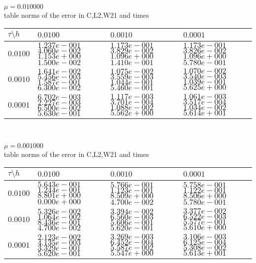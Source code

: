 
\begin{center}
$\mu=0.010000 $\\ 
table norms of the error in C,L2,W21 and times
\\[2.0ex]  
  
\begin{tabular}{|p{0.6in}|p{0.7in}|p{0.7in}|p{0.7in}|} \hline
$\tau\setminus h$ & $0.0100$& $0.0010$& $0.0001$\\ \hline

$0.0100$ & $1.237e-001$ $4.060e-002$ $1.153e+000$ $1.500e-002$ &$1.173e-001$ $3.829e-002$ $1.096e+000$ $1.410e-001$ &$1.173e-001$ $3.826e-002$ $1.096e+000$ $5.780e-001$  \\ \hline
$0.0010$ & $1.641e-002$ $5.456e-003$ $1.587e-001$ $6.300e-002$ &$1.075e-002$ $3.559e-003$ $1.044e-001$ $5.460e-001$ &$1.070e-002$ $3.540e-003$ $1.039e-001$ $5.625e+000$  \\ \hline
$0.0001$ & $6.702e-003$ $2.227e-003$ $6.500e-002$ $5.630e-001$ &$1.117e-003$ $3.701e-004$ $1.088e-002$ $5.562e+000$ &$1.061e-003$ $3.517e-004$ $1.034e-002$ $5.614e+001$  \\ \hline
\end{tabular}\\[20pt]
\end{center}
\begin{center}
$\mu=0.001000 $\\ 
table norms of the error in C,L2,W21 and times
\\[2.0ex]  
  
\begin{tabular}{|p{0.6in}|p{0.7in}|p{0.7in}|p{0.7in}|} \hline
$\tau\setminus h$ & $0.0100$& $0.0010$& $0.0001$\\ \hline

$0.0100$ & $5.643e-001$ $1.244e-001$ $8.801e+000$ $0.000e+000$ &$5.766e-001$ $1.123e-001$ $8.509e+000$ $4.700e-002$ &$5.758e-001$ $1.122e-001$ $8.506e+000$ $5.780e-001$  \\ \hline
$0.0010$ & $5.326e-002$ $1.064e-002$ $8.436e-001$ $4.700e-002$ &$3.394e-002$ $6.560e-003$ $5.606e-001$ $5.620e-001$ &$3.377e-002$ $6.522e-003$ $5.577e-001$ $5.610e+000$  \\ \hline
$0.0001$ & $2.123e-002$ $4.135e-003$ $3.329e-001$ $5.620e-001$ &$3.269e-003$ $6.452e-004$ $5.587e-002$ $5.547e+000$ &$3.106e-003$ $6.125e-004$ $5.308e-002$ $5.613e+001$  \\ \hline
\end{tabular}\\[20pt]
\end{center}

